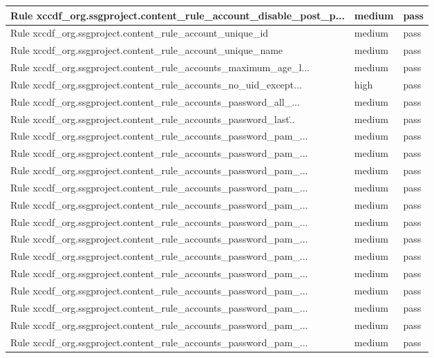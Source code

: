 \begin{longtable}{|p{7cm}|p{2cm}|p{2cm}|}
Rule xccdf\_org.ssgproject.content\_rule\_account\_disable\_post\_p... & medium & pass \\
\hline
Rule xccdf\_org.ssgproject.content\_rule\_account\_unique\_id & medium & pass \\
\hline
Rule xccdf\_org.ssgproject.content\_rule\_account\_unique\_name & medium & pass \\
\hline
Rule xccdf\_org.ssgproject.content\_rule\_accounts\_maximum\_age\_l... & medium & pass \\
\hline
Rule xccdf\_org.ssgproject.content\_rule\_accounts\_no\_uid\_except... & high & pass \\
\hline
Rule xccdf\_org.ssgproject.content\_rule\_accounts\_password\_all\_... & medium & pass \\
\hline
Rule xccdf\_org.ssgproject.content\_rule\_accounts\_password\_last\... & medium & pass \\
\hline
Rule xccdf\_org.ssgproject.content\_rule\_accounts\_password\_pam\_... & medium & pass \\
\hline
Rule xccdf\_org.ssgproject.content\_rule\_accounts\_password\_pam\_... & medium & pass \\
\hline
Rule xccdf\_org.ssgproject.content\_rule\_accounts\_password\_pam\_... & medium & pass \\
\hline
Rule xccdf\_org.ssgproject.content\_rule\_accounts\_password\_pam\_... & medium & pass \\
\hline
Rule xccdf\_org.ssgproject.content\_rule\_accounts\_password\_pam\_... & medium & pass \\
\hline
Rule xccdf\_org.ssgproject.content\_rule\_accounts\_password\_pam\_... & medium & pass \\
\hline
Rule xccdf\_org.ssgproject.content\_rule\_accounts\_password\_pam\_... & medium & pass \\
\hline
Rule xccdf\_org.ssgproject.content\_rule\_accounts\_password\_pam\_... & medium & pass \\
\hline
Rule xccdf\_org.ssgproject.content\_rule\_accounts\_password\_pam\_... & medium & pass \\
\hline
Rule xccdf\_org.ssgproject.content\_rule\_accounts\_password\_pam\_... & medium & pass \\
\hline
Rule xccdf\_org.ssgproject.content\_rule\_accounts\_password\_pam\_... & medium & pass \\
\hline
Rule xccdf\_org.ssgproject.content\_rule\_accounts\_password\_pam\_... & medium & pass \\
\hline
Rule xccdf\_org.ssgproject.content\_rule\_accounts\_password\_pam\_... & medium & pass \\
\hline


\end{longtable}
